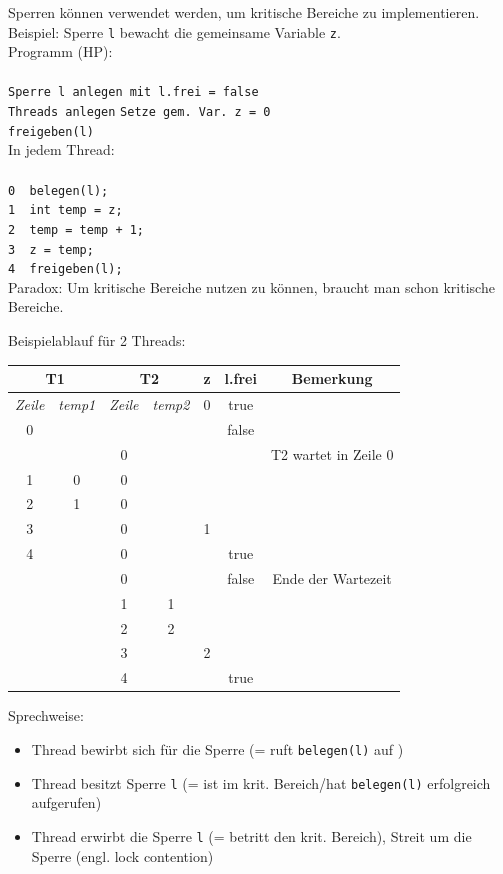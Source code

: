 Sperren können verwendet werden, um kritische Bereiche zu implementieren.\\
Beispiel: Sperre \texttt{l} bewacht die gemeinsame Variable \texttt{z}.\\
Programm (HP):\\
\\
\texttt{Sperre l anlegen mit l.frei = false}\\
\texttt{Threads anlegen}
\texttt{Setze gem. Var. z = 0}\\
\texttt{freigeben(l)}\\

In jedem Thread:\\
\\
\texttt{0 \ belegen(l);} \\
\texttt{1 \ int temp = z;} \\
\texttt{2 \ temp = temp + 1;} \\
\texttt{3 \ z = temp;} \\
\texttt{4 \ freigeben(l);}
\\

Paradox: Um kritische Bereiche nutzen zu können, braucht man schon kritische Bereiche.

Beispielablauf für 2 Threads:
\begin{center}
\begin{tabular}{c|c|c|c|c|c|c}
\multicolumn{2}{c|}{\textbf{T1}} & \multicolumn{2}{c|}{\textbf{T2}} & \textbf{z} & \textbf{l.frei} & \textbf{Bemerkung} \\ \hline
\emph{Zeile} & \emph{temp1} & \emph{Zeile} & \emph{temp2} & 0 & true & {} \\ \cline{1-4}
0 & {} & {} & {} & {} & false & {} \\
{} & {} & 0 & {} & {} & {} & T2 wartet in Zeile 0 \\
1 & 0 & 0 & {} & {} & {} & {} \\
2 & 1 & 0 & {} & {} & {} & {} \\
3 & {} & 0 & {} & 1 & {} & {} \\
4 & {} & 0 & {} & {} & true & {} \\
{} & {} & 0 & {} & {} & false & Ende der Wartezeit \\
{} & {} & 1 & 1 & {} & {} & {} \\
{} & {} & 2 & 2 & {} & {} & {} \\
{} & {} & 3 & {} & 2 & {} & {} \\
{} & {} & 4 & {} & {} & true & {} \\
\end{tabular}
\end{center}

Sprechweise:
\begin{itemize}
\item Thread bewirbt sich für die Sperre (= ruft \texttt{belegen(l)} auf )
\item Thread besitzt Sperre \texttt{l} (= ist im krit. Bereich/hat \texttt{belegen(l)} erfolgreich aufgerufen)
\item Thread erwirbt die Sperre \texttt{l} (= betritt den krit. Bereich), Streit um die Sperre (engl. lock contention)
\end{itemize}
